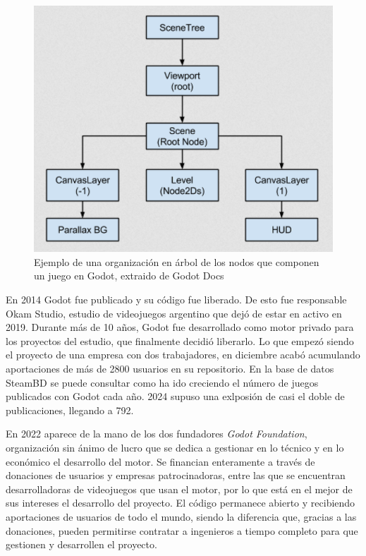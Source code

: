 \begin{figure}[h]
    \centering
    \includegraphics[scale=0.3]{img/godot-node-structure.png}
    \caption[Ejemplo de grafo de nodos en Godot]{Ejemplo de una organización en árbol de los nodos que componen un juego en Godot, extraido de Godot Docs\cite{godot-docs}}
    \label{fig:godottreeexpample}
\end{figure}

En 2014 Godot fue publicado y su código fue liberado. De esto fue responsable Okam Studio, estudio de videojuegos argentino que dejó de estar en activo en 2019. Durante más de 10 años, Godot fue desarrollado como motor privado para los proyectos del estudio, que finalmente decidió liberarlo. Lo que empezó siendo el proyecto de una empresa con dos trabajadores, en diciembre acabó acumulando aportaciones de más de 2800 usuarios en su repositorio. En la base de datos SteamBD\cite{steamdb} se puede consultar como ha ido creciendo el número de juegos publicados con Godot cada año. 2024 supuso una exlposión de casi el doble de publicaciones, llegando a 792.

En 2022 aparece de la mano de los dos fundadores \textit{Godot Foundation}\cite{godot-foundation}, organización sin ánimo de lucro que se dedica a gestionar en lo técnico y en lo económico el desarrollo del motor. Se financian enteramente a través de donaciones de usuarios y empresas patrocinadoras, entre las que se encuentran desarrolladoras de videojuegos que usan el motor, por lo que está en el mejor de sus intereses el desarrollo del proyecto. El código permanece abierto y recibiendo aportaciones de usuarios de todo el mundo, siendo la diferencia que, gracias a las donaciones, pueden permitirse contratar a ingenieros a tiempo completo para que gestionen y desarrollen el proyecto.

